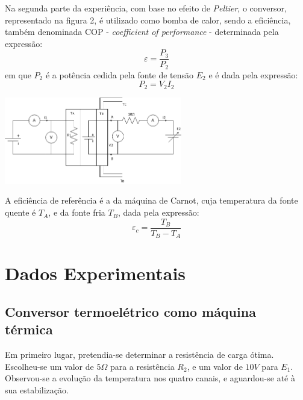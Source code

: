 \documentclass[9pt]{extarticle}
\begin{document}
\begin{multicols}{2}
Na segunda parte da experiência, com base no efeito de \textit{Peltier}, o conversor, representado na figura 2, é utilizado como bomba de calor, sendo a eficiência, também denominada COP - \textit{coefficient of performance} -  determinada pela expressão:
\begin{equation} \label{e}
\varepsilon=\frac{P_3}{P_2}
\end{equation}
em que $P_2$ é a potência cedida pela fonte de tensão $E_2$ e é dada pela expressão:
\begin{equation}
P_2= V_2 I_2
\end{equation}

\hspace{-0.8cm}
\begin{center}
\includegraphics[width=220pt]{figura2.png}
\begin{center}
\par{}
\end{center}
\end{center}

A eficiência de referência é a da máquina de Carnot, cuja temperatura da fonte quente é $T_A$, e da fonte fria $T_B$, dada pela expressão:
\begin{equation} \label{ec}
\varepsilon_c = \frac{T_B}{T_B - T_A}
\end{equation}

\section{Dados Experimentais}

\subsection*{Conversor termoelétrico como máquina térmica}

\par Em primeiro lugar, pretendia-se determinar a resistência de carga ótima. Escolheu-se um valor de $5\Omega$ para a resistência $R_2$, e um valor de $10V$ para $E_1$. Observou-se a evolução da temperatura nos quatro canais, e aguardou-se até à sua estabilização.


\end{multicols}
\end{document}
